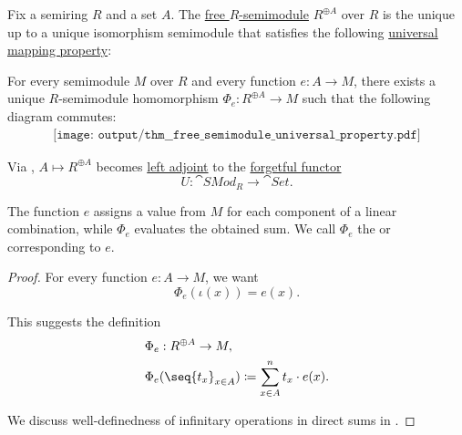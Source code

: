 \begin{theorem}\label{thm:free_semimodule_universal_property}
  Fix a semiring \( R \) and a set \( A \). The \hyperref[def:free_semimodule]{free \( R \)-semimodule} \( R^{\oplus A} \) over \( R \) is the unique up to a unique isomorphism semimodule that satisfies the following \hyperref[rem:universal_mapping_property]{universal mapping property}:
  \begin{displayquote}
    For every semimodule \( M \) over \( R \) and every function \( e: A \to M \), there exists a unique \( R \)-semimodule homomorphism \( \Phi_e: R^{\oplus A} \to M \) such that the following diagram commutes:
    \begin{equation}\label{eq:thm:free_semimodule_universal_property/diagram}
      \begin{aligned}
        \texttt{[image: output/thm\_\_free\_semimodule\_universal\_property.pdf]}
      \end{aligned}
    \end{equation}
  \end{displayquote}

  Via , \( A \mapsto R^{\oplus A} \) becomes \hyperref[def:category_adjunction]{left adjoint} to the \hyperref[def:concrete_category]{forgetful functor}
  \begin{equation*}
    U: \cat{SMod}_R \to \cat{Set}.
  \end{equation*}

  The function \( e \) assigns a value from \( M \) for each component of a linear combination, while \( \Phi_e \) evaluates the obtained sum. We call \( \Phi_e \) the  or  corresponding to \( e \).
\end{theorem}
\begin{proof}
  For every function \( e: A \to M \), we want
  \begin{equation*}
    \Phi_e(\iota(x)) = e(x).
  \end{equation*}

  This suggests the definition
  \begin{equation*}
    \begin{aligned}
      &\Phi_e: R^{\oplus A} \to M, \\
      &\Phi_e(\seq{ t_x }_{x \in A}) \coloneqq \sum_{x \in A}^n t_x \cdot e(x).
    \end{aligned}
  \end{equation*}

  We discuss well-definedness of infinitary operations in direct sums in .
\end{proof}

